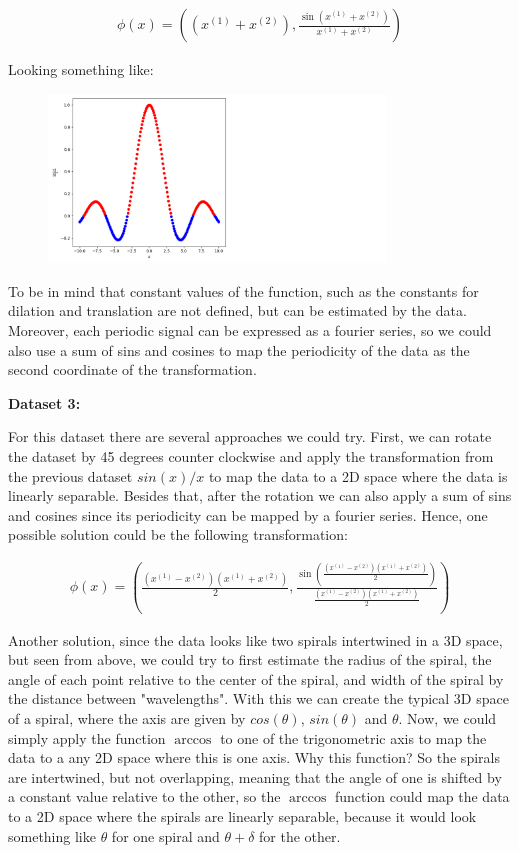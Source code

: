 \documentclass[12pt,a4paper,oneside]{paper}
\begin{document}
\begin{align*}
    \phi(x) = \left( (x^{(1)} + x^{(2)}), \frac{\sin(x^{(1)} + x^{(2)})}{x^{(1)} + x^{(2)}} \right)
\end{align*}

Looking something like: 

\begin{figure}[H]
    \centering
    \includegraphics[width=0.8\textwidth]{sin_x_over_x.png}
\end{figure}

To be in mind that constant values of the function, such as the constants for dilation and translation are not defined,
but can be estimated by the data.
Moreover, each periodic signal can be expressed as a fourier series, so we could also use a sum of sins and cosines to map the
periodicity of the data as the second coordinate of the transformation.

\textbf{Dataset 3:}

For this dataset there are several approaches we could try. 
First, we can rotate the dataset by 45 degrees counter clockwise
and apply the transformation from the previous dataset $sin(x)/x$ to map the data to a 2D space where the data is linearly separable.
Besides that, after the rotation we can also apply a sum of sins and cosines since its periodicity can be mapped by a fourier series.
Hence, one possible solution could be the following transformation:

\begin{align*}
    \phi(x) = \left( \frac{(x^{(1)} - x^{(2)})(x^{(1)} + x^{(2)})}{2}, \frac{\sin\left(\frac{(x^{(1)} - x^{(2)})(x^{(1)} + x^{(2)})}{2}\right)}{\frac{(x^{(1)} - x^{(2)})(x^{(1)} + x^{(2)})}{2}} \right)
\end{align*}

Another solution, since the data looks like two spirals intertwined in a 3D space, but seen from above, we could try to first estimate the radius of the spiral, the angle of each point relative to the center of the spiral, and width of the spiral
by the distance between "wavelengths". With this we can create the typical 3D space of a spiral, where the axis are given by $cos(\theta)$, $sin(\theta)$ and $\theta$.
Now, we could simply apply the function $\arccos$ to one of the trigonometric axis to map the data to a any 2D space where this is one axis.
Why this function? So the spirals are intertwined, but not overlapping, meaning that the angle of one is shifted by a constant value relative to the other, so
the $\arccos$ function could map the data to a 2D space where the spirals are linearly separable, because it would look something like $\theta$ for one spiral and $\theta + \delta$ for the other.
\end{document}
